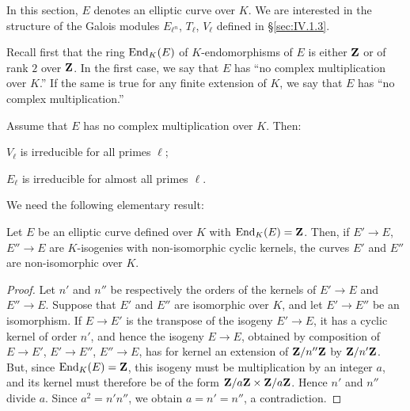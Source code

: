 

In this section, $E$ denotes an elliptic curve over $K$.  We are
interested in the structure of the Galois modules $E_{\ell^n}$, $T_\ell$,
$V_\ell$ defined in \S\ref{sec:IV.1.3}.


Recall first that the ring $\mathrm{End}_K(E)$ of $K$-endomorphisms of $E$ is
either $\mathbf{Z}$ or of rank $2$ over $\mathbf{Z}$.  In the first case, we say that $E$
has ``no complex multiplication over $K$.''  If the same is true for any
finite extension of $K$, we say that $E$ has ``no complex
multiplication.''

\begin{theorem}\label{thm:IV.2.1.1}
Assume that $E$ has no complex multiplication over $K$.  Then:
\begin{alist}
\item $V_\ell$ is irreducible for all primes $\ell$;
\item $E_\ell$ is irreducible for almost all primes $\ell$.
\end{alist}
\end{theorem}

We need the following elementary result:

\begin{lemma}\label{lem:IV.2.1.1}
Let $E$ be an elliptic curve defined over $K$ with $\mathrm{End}_K(E) = \mathbf{Z}$.
Then, if $E' \to E$, $E'' \to E$ are $K$-isogenies with non-isomorphic
cyclic kernels, the curves $E'$ and $E''$ are non-isomorphic over $K$.
\end{lemma}

\begin{proof}
Let $n'$ and $n''$ be respectively the orders of the kernels of
$E' \to E$ and $E'' \to E$.  Suppose that $E'$ and $E''$ are isomorphic
over $K$, and let $E' \to E''$ be an isomorphism.  If $E \to E'$ is the
transpose of the isogeny $E' \to E$, it has a cyclic kernel of order
$n'$, and hence the isogeny $E \to E$, obtained by composition of
$E \to E'$, $E' \to E''$, $E'' \to E$, has for kernel an extension of
$\mathbf{Z}/n''\mathbf{Z}$ by $\mathbf{Z}/n'\mathbf{Z}$.  But, since $\mathrm{End}_K(E) = \mathbf{Z}$, this isogeny must
be multiplication by an integer $a$, and its kernel must therefore be of
the form $\mathbf{Z}/a\mathbf{Z} \times \mathbf{Z}/a\mathbf{Z}$.  Hence $n'$ and $n''$ divide $a$.
Since $a^2 = n'n''$, we obtain $a = n' = n''$, a contradiction.
\end{proof}

